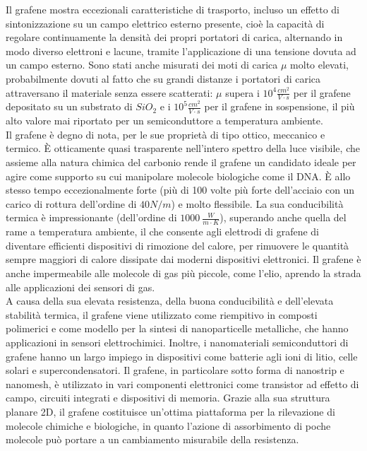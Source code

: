 \documentclass[a4paper,titlepage]{book}
\begin{document}
Il grafene mostra eccezionali caratteristiche di trasporto, incluso un effetto di sintonizzazione su un campo elettrico esterno presente, cioè la capacità di regolare continuamente la densità dei propri portatori di carica, alternando in modo diverso elettroni e lacune, tramite l'applicazione di una tensione dovuta ad un campo esterno. Sono stati anche misurati dei moti di carica $\mu$ molto elevati, probabilmente dovuti al fatto che su grandi distanze i portatori di carica attraversano il materiale senza essere scatterati: $\mu$ supera i $10^4 \frac{cm^2}{V \cdot s}$ per il grafene depositato su un substrato di $SiO_2$ e i $10^5 \frac{cm^2}{V \cdot s}$ per il grafene in sospensione, il più alto valore mai riportato per un semiconduttore a temperatura ambiente. \\
Il grafene è degno di nota, per le sue proprietà di tipo ottico, meccanico e termico. È otticamente quasi trasparente nell'intero spettro della luce visibile, che assieme alla natura chimica del carbonio rende il grafene un candidato ideale per agire come supporto su cui manipolare molecole biologiche come il DNA. È allo stesso tempo eccezionalmente forte (più di 100 volte più forte dell'acciaio con un carico di rottura dell'ordine di $40 N / m$) e molto flessibile. La sua conducibilità termica è impressionante (dell'ordine di $1000 \: \frac{W}{m \cdot K}$), superando anche quella del rame a temperatura ambiente, il che consente agli elettrodi di grafene di diventare efficienti dispositivi di rimozione del calore, per rimuovere le quantità sempre maggiori di calore dissipate dai moderni dispositivi elettronici. Il grafene è anche impermeabile alle molecole di gas più piccole, come l'elio, aprendo la strada alle applicazioni dei sensori di gas.\\
A causa della sua elevata resistenza, della buona conducibilità e dell'elevata stabilità termica, il grafene viene utilizzato come riempitivo in composti polimerici e come modello per la sintesi di nanoparticelle metalliche, che hanno applicazioni in sensori elettrochimici. Inoltre, i nanomateriali semiconduttori di grafene hanno un largo impiego in dispositivi come batterie agli ioni di litio, celle solari e supercondensatori. Il grafene, in particolare sotto forma di nanostrip e nanomesh, è utilizzato in vari componenti elettronici come transistor ad effetto di campo, circuiti integrati e dispositivi di memoria. Grazie alla sua struttura planare 2D, il grafene costituisce un'ottima piattaforma per la rilevazione di molecole chimiche e biologiche, in quanto l'azione di assorbimento di poche molecole può portare a un cambiamento misurabile della resistenza.\\
\end{document}
